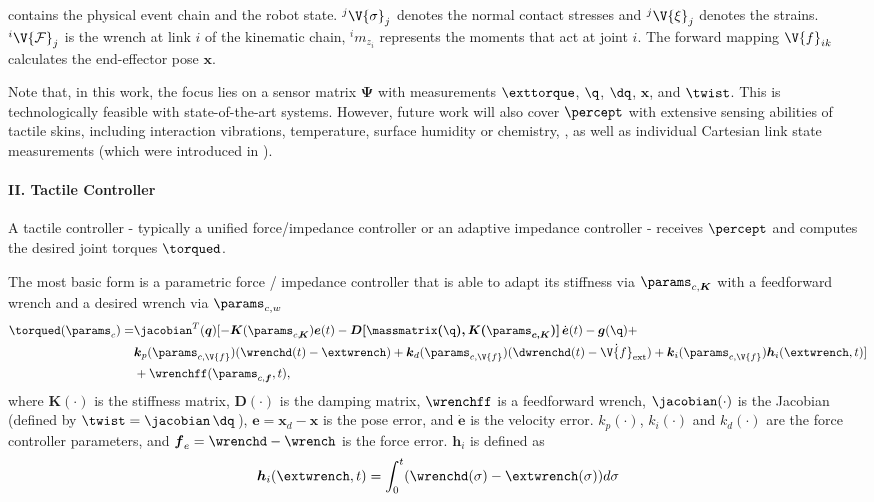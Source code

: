 contains the physical event chain and the robot state. ${}^j\V{\sigma}_j$ denotes the normal contact stresses and ${}^j\V{\xi}_j$ denotes the strains.
${}^i\V{\mathcal{F}}_j$ is the wrench at link $i$ of the kinematic chain, ${}^i m_{z_i}$ represents the moments that act at joint $i$.
The forward mapping $\V{f}_{ik}$ calculates the end-effector pose $\boldsymbol{x}$. 

Note that, in this work, the focus lies on a sensor matrix $\boldsymbol{\Psi}$ with measurements $\exttorque$, $\q$, $\dq$, $\boldsymbol{x}$, and $\twist$. This is technologically feasible with state-of-the-art systems.
However, future work will also cover $\percept$ with extensive sensing abilities of tactile skins, including interaction vibrations, temperature, surface humidity or chemistry, \cite{liang2019soft, koiva2020barometer}, as well as individual Cartesian link state measurements (which were introduced in \cite{dahiya2019large, birjandi2020observer}).

\paragraph*{II. Tactile Controller}
 A tactile controller - typically a unified force/impedance controller \cite{AlbuSchaffer.2007,schindlbeck2015unified} or an adaptive impedance controller \cite{li2018force} - receives $\percept$ and computes the desired joint torques $\torqued$.


 The most basic form is a parametric force / impedance controller that is able to adapt its stiffness via $\params_{c,\boldsymbol{K}}$ with a feedforward wrench and a desired wrench via $\params_{c,w}$
\begin{align*}
    \torqued (\params_c)=&\jacobian^T(\boldsymbol{q})[-\boldsymbol{K}(\params_{c,\!\boldsymbol{K}})\boldsymbol{e}(t) - \boldsymbol{D[\massmatrix(\q),\boldsymbol{K}(\params_{c,\boldsymbol{K}})]}\, \dot{\boldsymbol{e}}(t) - \boldsymbol{g}(\q) +\\ &\boldsymbol{k}_p(\params_{c,\V{f}}) (\wrenchd(t)-\extwrench)+\boldsymbol{k}_d(\params_{c,\V{f}}) (\dwrenchd(t)-\dot{\V{f}}_\text{ext})+\boldsymbol{k}_i(\params_{c,\V{f}}) \boldsymbol{h}_i(\extwrench,t)]\\
    &+\wrenchff(\params_{c,\boldsymbol{f}},t),
\end{align*}
where $\boldsymbol{K}(\cdot)$ is the stiffness matrix, $\boldsymbol{D}(\cdot)$ is the damping matrix, $\wrenchff$ is a feedforward wrench, $\jacobian(\cdot)$ is the Jacobian (defined by $\twist=\jacobian \,\dq$\,), $\boldsymbol{e}=\boldsymbol{x}_d-\boldsymbol{x}$ is the pose error, and $\dot{\boldsymbol{e}}$ is the velocity error.
$k_p(\cdot)$, $k_i(\cdot)$ and $k_d(\cdot)$ are the force controller parameters, and $\boldsymbol{f}_e=\wrenchd-\wrench$ is the force error.
$\boldsymbol{h}_i$ is defined as
\begin{equation*}
    \boldsymbol{h}_i(\extwrench,t)=\int_0^t (\wrenchd(\sigma)-\extwrench(\sigma))d\sigma
\end{equation*}


